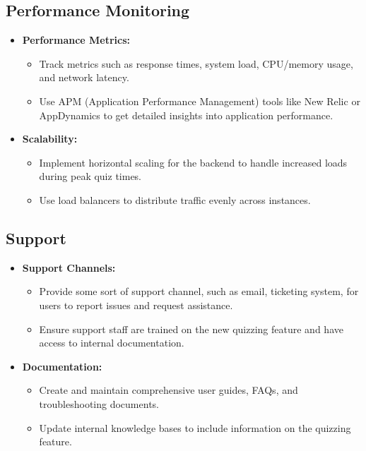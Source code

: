 \subsection{Performance Monitoring}

\begin{itemize}
    \item \textbf{Performance Metrics:}
          \begin{itemize}
              \item Track metrics such as response times, system load, CPU/memory usage, and network latency.
              \item Use APM (Application Performance Management) tools like New Relic or AppDynamics to get detailed insights into application performance.
          \end{itemize}
    \item \textbf{Scalability:}
          \begin{itemize}
              \item Implement horizontal scaling for the backend to handle increased loads during peak quiz times.
              \item Use load balancers to distribute traffic evenly across instances.
          \end{itemize}
\end{itemize}


\subsection{Support}

\begin{itemize}
    \item \textbf{Support Channels:}
          \begin{itemize}
              \item Provide some sort of support channel, such as email, ticketing system, for users to report issues and request assistance.
              \item Ensure support staff are trained on the new quizzing feature and have access to internal documentation.
          \end{itemize}
    \item \textbf{Documentation:}
          \begin{itemize}
              \item Create and maintain comprehensive user guides, FAQs, and troubleshooting documents.
              \item Update internal knowledge bases to include information on the quizzing feature.
          \end{itemize}
\end{itemize}


